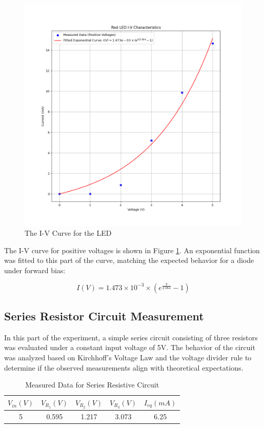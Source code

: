 \documentclass[12pt]{article}
\begin{document}
\begin{figure}[H]
	\center
	\includegraphics[width=13cm]{01_2}
	\caption{The I-V Curve for the LED}
	\label{fig:ex2}
\end{figure}

The I-V curve for positive voltages is shown in Figure \ref{fig:ex2}. An exponential function was fitted to this part of the curve, matching the expected behavior for a diode under forward bias:

\[ I(V) = 1.473 \times 10^{-3} \times (e^{\frac{V}{2.064}} - 1) \]

\subsection{Series Resistor Circuit Measurement}
In this part of the experiment, a simple series circuit consisting of three
resistors was evaluated under a constant input voltage of 5V. The behavior of
the circuit was analyzed based on Kirchhoff's Voltage Law and the voltage
divider rule to determine if the observed measurements align with theoretical
expectations.

\begin{table}[H]
	\centering
	\begin{tabular}{|c||c|c|c|c|}
		\hline
		\textbf{\(V_{in} (V)\)} & \textbf{\(V_{R_1} (V)\)} & \textbf{\(V_{R_2} (V)\)} & \textbf{\(V_{R_3} (V)\)} & \textbf{\(I_{eq} (mA)\)} \\
		\hline
		5                       & 0.595                    & 1.217                    & 3.073                    & 6.25                     \\
		\hline
	\end{tabular}
	\caption{Measured Data for Series Resistive Circuit}
	\label{tab:series_data}
\end{table}
\end{document}
